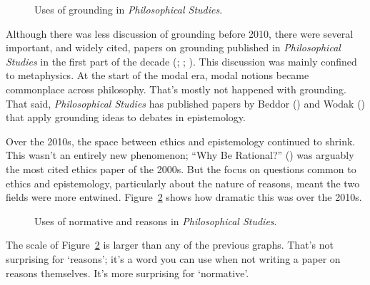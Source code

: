\documentclass[
  10pt,
  letterpaper,
  DIV=11,
  numbers=noendperiod,
  twoside]{scrartcl}
\begin{document}
\begin{figure}


\caption{\label{fig-grounding}Uses of grounding in \emph{Philosophical
Studies}.}

\end{figure}%

Although there was less discussion of grounding before 2010, there were
several important, and widely cited, papers on grounding published in
\emph{Philosophical Studies} in the first part of the decade
(;
;
). This discussion
was mainly confined to metaphysics. At the start of the modal era, modal
notions became commonplace across philosophy. That's mostly not happened
with grounding. That said, \emph{Philosophical Studies} has published
papers by Beddor () and Wodak
() that apply grounding ideas to
debates in epistemology.

Over the 2010s, the space between ethics and epistemology continued to
shrink. This wasn't an entirely new phenomenon; ``Why Be Rational?''
() was arguably the most
cited ethics paper of the 2000s. But the focus on questions common to
ethics and epistemology, particularly about the nature of reasons, meant
the two fields were more entwined. Figure~\ref{fig-normative-reasons}
shows how dramatic this was over the 2010s.

\begin{figure}


\caption{\label{fig-normative-reasons}Uses of normative and reasons in
\emph{Philosophical Studies}.}

\end{figure}%

The scale of Figure~\ref{fig-normative-reasons} is larger than any of
the previous graphs. That's not surprising for `reasons'; it's a word
you can use when not writing a paper on reasons themselves. It's more
surprising for `normative'.
\end{document}
